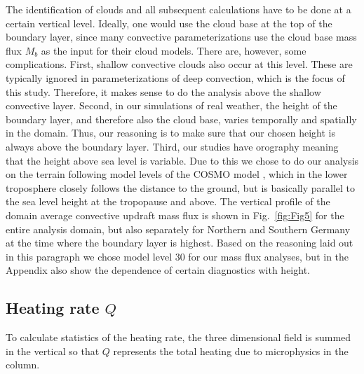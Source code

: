 \documentclass[a4paper, 12pt]{article}
\begin{document}
The identification of clouds and all subsequent calculations have to be done at a certain vertical level. Ideally, one would use the cloud base at the top of the boundary layer, since many convective parameterizations use the cloud base mass flux $M_b$ as the input for their cloud models. There are, however, some complications. First, shallow convective clouds also occur at this level. These are typically ignored in parameterizations of deep convection, which is the focus of this study. Therefore, it makes sense to do the analysis above the shallow convective layer. Second, in our simulations of real weather, the height of the boundary layer, and therefore also the cloud base, varies temporally and spatially in the domain. Thus, our reasoning is to make sure that our chosen height is always above the boundary layer. Third, our studies have orography meaning that the height above sea level is variable. Due to this we chose to do our analysis on the terrain following model levels of the COSMO model \citep{???}, which in the lower troposphere closely follows the distance to the ground, but is basically parallel to the sea level height at the tropopause and above. The vertical profile of the domain average convective updraft mass flux is shown in Fig.~\ref{fig:Fig5} for the entire analysis domain, but also separately for Northern and Southern Germany at the time where the boundary layer is highest. Based on the reasoning laid out in this paragraph we chose model level 30 for our mass flux analyses, but in the Appendix also show the dependence of certain diagnostics with height.



\subsection{Heating rate $Q$}
To calculate statistics of the heating rate, the three dimensional field is summed in the vertical so that $Q$ represents the total heating due to microphysics in the column. 
\end{document}

